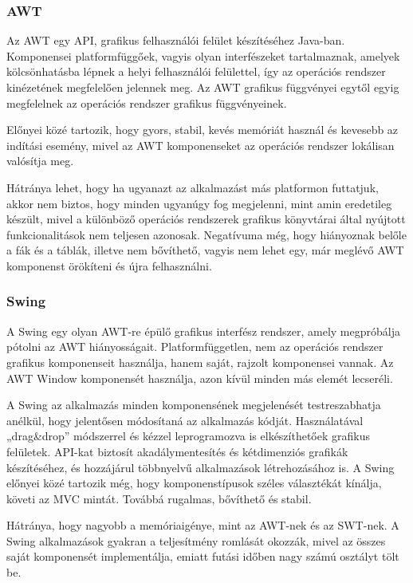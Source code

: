\subsubsection*{AWT} 

Az AWT egy API, grafikus felhasználói felület készítéséhez Java-ban. \cite{gui}\cite{awt}
Komponensei platformfüggőek, vagyis olyan interfészeket tartalmaznak, amelyek kölcsönhatásba lépnek a helyi felhasználói felülettel, így az operációs rendszer kinézetének megfelelően jelennek meg.
Az AWT grafikus függvényei egytől egyig megfelelnek az operációs rendszer grafikus függvényeinek.

Előnyei közé tartozik, hogy gyors, stabil, kevés memóriát használ és kevesebb az indítási esemény, mivel az AWT komponenseket az operációs rendszer lokálisan valósítja meg.

Hátránya lehet, hogy ha ugyanazt az alkalmazást más platformon futtatjuk, akkor nem biztos, hogy minden ugyanúgy fog megjelenni, mint amin eredetileg készült, mivel a különböző operációs rendszerek grafikus könyvtárai által nyújtott funkcionalitások nem teljesen azonosak.
Negatívuma még, hogy hiányoznak belőle a fák és a táblák, illetve nem bővíthető, vagyis nem lehet egy, már meglévő AWT komponenst örökíteni és újra felhasználni.


\subsubsection*{Swing}

A Swing egy olyan AWT-re épülő grafikus interfész rendszer, amely megpróbálja pótolni az AWT hiányosságait.\cite{gui}\cite{swing}
Platformfüggetlen, nem az operációs rendszer grafikus komponenseit használja, hanem saját, rajzolt komponensei vannak.
Az AWT Window komponensét használja, azon kívül minden más elemét lecseréli.

A Swing az alkalmazás minden komponensének megjelenését testreszabhatja anélkül, hogy jelentősen módosítaná az alkalmazás kódját.
Használatával „drag\&drop”  módszerrel és kézzel leprogramozva is elkészíthetőek grafikus felületek.
API-kat biztosít akadálymentesítés és kétdimenziós grafikák készítéséhez, és hozzájárul többnyelvű alkalmazások létrehozásához is.
A Swing előnyei közé tartozik még, hogy komponenstípusok széles választékát kínálja, követi az MVC mintát.
Továbbá rugalmas, bővíthető és stabil.

Hátránya, hogy nagyobb a memóriaigénye, mint az AWT-nek és az SWT-nek.
A Swing alkalmazások gyakran a teljesítmény romlását okozzák, mivel az összes saját komponensét implementálja, emiatt futási időben nagy számú osztályt tölt be.


